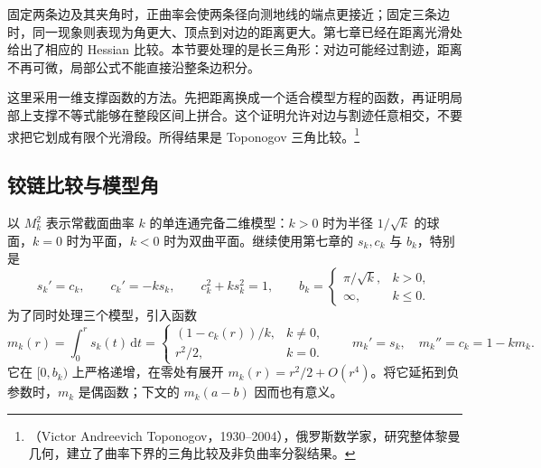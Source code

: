 
% 
% 


固定两条边及其夹角时，正曲率会使两条径向测地线的端点更接近；固定三条边时，同一现象则表现为角更大、顶点到对边的距离更大。第七章已经在距离光滑处给出了相应的 Hessian 比较。本节要处理的是长三角形：对边可能经过割迹，距离不再可微，局部公式不能直接沿整条边积分。

这里采用一维支撑函数的方法。先把距离换成一个适合模型方程的函数，再证明局部上支撑不等式能够在整段区间上拼合。这个证明允许对边与割迹任意相交，不要求把它划成有限个光滑段。所得结果是 Toponogov 三角比较。\footnote{（Victor Andreevich Toponogov，1930--2004），俄罗斯数学家，研究整体黎曼几何，建立了曲率下界的三角比较及非负曲率分裂结果。}

\subsection{铰链比较与模型角}
\label{g3:subsec:0903:01}

以 \(M_k^2\) 表示常截面曲率 \(k\) 的单连通完备二维模型：\(k>0\) 时为半径 \(1/\sqrt{k}\) 的球面，\(k=0\) 时为平面，\(k<0\) 时为双曲平面。继续使用第七章的 \(s_k,c_k\) 与 \(b_k\)，特别是
\[
 s_k'=c_k,\qquad c_k'=-ks_k,\qquad c_k^2+ks_k^2=1,
 \qquad b_k=\begin{cases}\pi/\sqrt{k},&k>0,\\ \infty,&k\le0.\end{cases}
\]
为了同时处理三个模型，引入函数
\begin{equation}\label{g3:eq:modified-model-distance}
 m_k(r)=\int_0^r s_k(t)\,\mathrm dt
 =\begin{cases}
 (1-c_k(r))/k,&k\ne0,\\ r^2/2,&k=0.
 \end{cases}
 \qquad m_k'=s_k,\quad m_k''=c_k=1-km_k.
\end{equation}
它在 \([0,b_k)\) 上严格递增，在零处有展开 \(m_k(r)=r^2/2+O(r^4)\)。将它延拓到负参数时，\(m_k\) 是偶函数；下文的 \(m_k(a-b)\) 因而也有意义。

